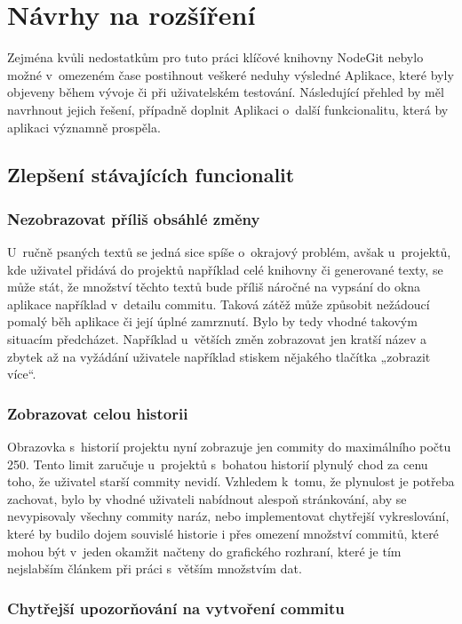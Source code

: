 \chapter{Návrhy na rozšíření}

Zejména kvůli nedostatkům pro tuto práci klíčové knihovny NodeGit nebylo možné v~omezeném čase postihnout veškeré neduhy výsledné Aplikace, které byly objeveny během vývoje či při uživatelském testování. Následující přehled by měl navrhnout jejich řešení, případně doplnit Aplikaci o~další funkcionalitu, která by aplikaci významně prospěla.


\section{Zlepšení stávajících funcionalit}

\subsection{Nezobrazovat příliš obsáhlé změny}

U~ručně psaných textů se jedná sice spíše o~okrajový problém, avšak u~projektů, kde uživatel přidává do projektů například celé knihovny či generované texty, se může stát, že množství těchto textů bude příliš náročné na vypsání do okna aplikace například v~detailu commitu. Taková zátěž může způsobit nežádoucí pomalý běh aplikace či její úplné zamrznutí. Bylo by tedy vhodné takovým situacím předcházet. Například u~větších změn zobrazovat jen kratší název a zbytek až na vyžádání uživatele například stiskem nějakého tlačítka „zobrazit více“.

\subsection{Zobrazovat celou historii}

Obrazovka s~historií projektu nyní zobrazuje jen commity do maximálního počtu 250. Tento limit zaručuje u~projektů s~bohatou historií plynulý chod za cenu toho, že uživatel starší commity nevidí. Vzhledem k~tomu, že plynulost je potřeba zachovat, bylo by vhodné uživateli nabídnout alespoň stránkování, aby se nevypisovaly všechny commity naráz, nebo implementovat chytřejší vykreslování, které by budilo dojem souvislé historie i přes omezení množství commitů, které mohou být v~jeden okamžit načteny do grafického rozhraní, které je tím nejslabším článkem při práci s~větším množstvím dat.

\subsection{Chytřejší upozorňování na vytvoření commitu}

